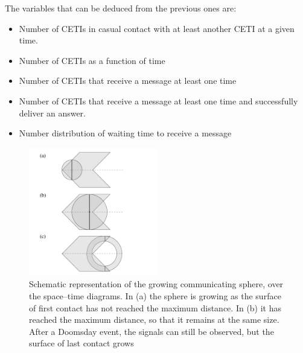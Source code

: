 \documentclass[useAMS,usenatbib]{mnras}
\begin{document}
The variables that can be deduced from the previous ones are:

\begin{itemize}
   \item Number of CETIs in casual contact with at least another CETI
      at a given time.
   \item Number of CETIs as a function of time
   \item Number of CETIs that receive a message at least one time
   \item Number of CETIs that receive a message at least one time and
      successfully deliver an answer.
   \item Number distribution of waiting time to receive a message
\end{itemize}


                   

\begin{figure}
   \centering
   \includegraphics[width=0.5\textwidth]{growingsphere.pdf}
   \caption{Schematic representation of the growing communicating
   sphere, over the space--time diagrams.  In (a) the sphere is
   growing as the surface of first contact has not reached the maximum
   distance.  In (b) it has reached the maximum distance, so that it
   remains at the same size.  After a Doomsday event, the signals can
   still be observed, but the surface of last contact grows }
   \label{F_sphere}
\end{figure}
\end{document}
